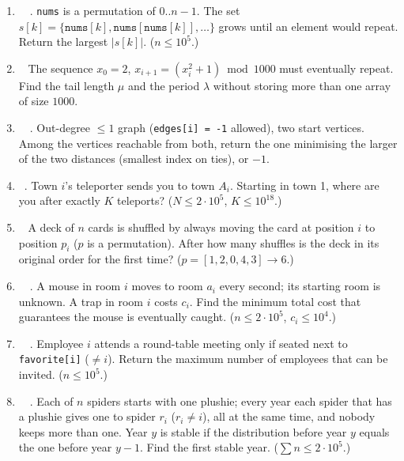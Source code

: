 \exlegend
\begin{enumerate}[leftmargin=*, label=\textbf{E5.\arabic*}, itemsep=6pt]
    \item \exeasy\ \pconcept {}\ . \texttt{nums} is a permutation of $0..n-1$. The set $s[k] = \{\texttt{nums}[k], \texttt{nums}[\texttt{nums}[k]], \dots\}$ grows until an element would repeat. Return the largest $|s[k]|$. ($n \le 10^5$.)
    \item \exeasy\ \pconcept {} The sequence $x_0 = 2$, $x_{i+1} = (x_i^2 + 1) \bmod 1000$ must eventually repeat. Find the tail length $\mu$ and the period $\lambda$ without storing more than one array of size $1000$.
    \item \exmedium\ \ptricky {}\ . Out-degree $\le 1$ graph (\texttt{edges[i] = -1} allowed), two start vertices. Among the vertices reachable from both, return the one minimising the larger of the two distances (smallest index on ties), or $-1$.
    \item \exmedium\ \pclassic {}. Town $i$'s teleporter sends you to town $A_i$. Starting in town 1, where are you after exactly $K$ teleports? ($N \le 2\cdot10^5$, $K \le 10^{18}$.)
    \item \exmedium\ \pconcept {} A deck of $n$ cards is shuffled by always moving the card at position $i$ to position $p_i$ ($p$ is a permutation). After how many shuffles is the deck in its original order for the first time? ($p = [1,2,0,4,3] \to 6$.)
    \item \exhard\ \pclassic {}\ . A mouse in room $i$ moves to room $a_i$ every second; its starting room is unknown. A trap in room $i$ costs $c_i$. Find the minimum total cost that guarantees the mouse is eventually caught. ($n \le 2\cdot10^5$, $c_i \le 10^4$.)
    \item \exhard\ \ptricky {}\ . Employee $i$ attends a round-table meeting only if seated next to \texttt{favorite[i]} ($\ne i$). Return the maximum number of employees that can be invited. ($n \le 10^5$.)
    \item \exhard\ \precent {}\ . Each of $n$ spiders starts with one plushie; every year each spider that has a plushie gives one to spider $r_i$ ($r_i \ne i$), all at the same time, and nobody keeps more than one. Year $y$ is stable if the distribution before year $y$ equals the one before year $y-1$. Find the first stable year. ($\sum n \le 2\cdot10^5$.)
\end{enumerate}

